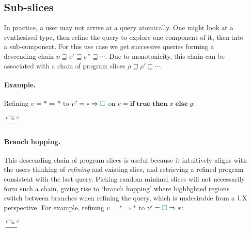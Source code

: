 \subsection{\yo Sub-slices}
\label{sec:sub-slices}

In practice, a user may not arrive at a query atomically. One might look at a synthesised type, then refine the query to explore one component of it, then into a sub-component. For this use case we get successive queries forming a descending chain $\upsilon \sqsupseteq \upsilon' \sqsupseteq \upsilon'' \sqsupseteq \cdots$. Due to monotonicity, this chain can be associated with a chain of program slices $\rho \sqsupseteq \rho' \sqsubseteq \cdots$.

\paragraph{Example.} Refining $\upsilon = \mathbf{*}\Rightarrow\mathbf{*}$ to $\upsilon' = \mathbf{*}\Rightarrow{\color{teal}\Box}$ on $e = \mathbf{if}\;\mathbf{true}\;\mathbf{then}\;x\;\mathbf{else}\;y$:
\begin{center}
\quad$\xrightarrow{\upsilon' \sqsubseteq \upsilon}$\quad
{}
\end{center}

\paragraph{Branch hopping.} This descending chain of program slices is useful because it intuitively aligns with the users thinking of \textit{refining} and existing slice, and retrieving a refined program consistent with the last query. Picking random minimal slices will not necessarily form such a chain, giving rise to `branch hopping' where highlighted regions switch between branches when refining the query, which is undesirable from a UX perspective. For example, refining $\upsilon = \mathbf{*}\Rightarrow\mathbf{*}$ to $\upsilon' = {\color{teal}\Box}\Rightarrow\mathbf{*}$:
\begin{center}
\quad$\xrightarrow{\upsilon' \sqsubseteq \upsilon}$\quad
{}
\end{center}

